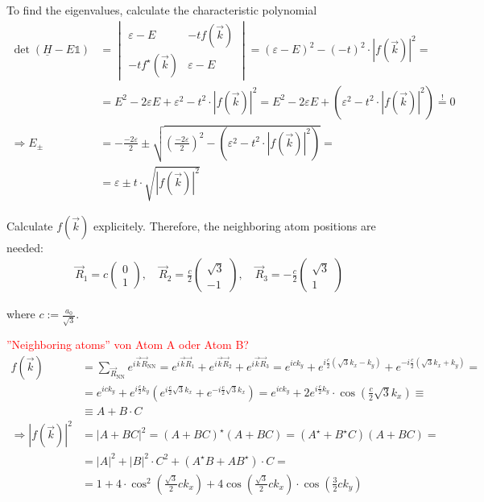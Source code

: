 \documentclass{article}
\newcommand{\lr}[1]{\left(#1\right)}
\begin{document}
{	To find the eigenvalues, calculate the characteristic polynomial
		\begin{align*}
			\det(\underline{H} - E\mathbb{1}) &=
			\begin{vmatrix}
				\varepsilon - E & -t f(\vec{k}) \\
				-t f^\star(\vec{k}) & \varepsilon - E
			\end{vmatrix}
			=
			(\varepsilon - E)^2 - (-t)^2 \cdot |f(\vec{k})|^2 = \\
			&= E^2 - 2\varepsilon E + \varepsilon^2 - t^2 \cdot |f(\vec{k})|^2 = E^2 - 2\varepsilon E + (\varepsilon^2 - t^2 \cdot |f(\vec{k})|^2) \stackrel{!}{=} 0 \\
			\Rightarrow E_\pm &= -\frac{-2\varepsilon}{2} \pm \sqrt{ \lr{\frac{-2\varepsilon}{2}}^2 - (\varepsilon^2 - t^2 \cdot |f(\vec{k})|^2 ) } = \\
			&= \varepsilon \pm t \cdot \sqrt{ |f(\vec{k})|^2 }
		\end{align*}
	
	Calculate $f(\vec{k})$ explicitely. Therefore, the neighboring atom positions are needed:
		\begin{align*}
			\vec{R}_1 = c
			\begin{pmatrix}
				0\\1
			\end{pmatrix}, \quad
			\vec{R}_2 = \frac{c}{2}
			\begin{pmatrix}
				\sqrt{3}\\-1
			\end{pmatrix}, \quad
			\vec{R}_3 = -\frac{c}{2}
			\begin{pmatrix}
				\sqrt{3}\\1
			\end{pmatrix} 
		\end{align*}

	where $c:=\frac{a_0}{\sqrt{3}}$.

\newpage


	\textcolor{red}{ ''Neighboring atoms'' von Atom A oder Atom B?}
		\begin{align*}
			f(\vec{k}) &= \sum_{\vec{R}_\text{NN}} e^{i\vec{k}\vec{R}_\text{NN}} = e^{i\vec{k}\vec{R}_1} + e^{i\vec{k}\vec{R}_2} + e^{i\vec{k}\vec{R}_3} = e^{ick_y} + e^{i\frac{c}{2}(\sqrt{3}k_x - k_y)} + e^{-i\frac{c}{2}(\sqrt{3}k_x + k_y)} = \\
			&= e^{ick_y} + e^{i\frac{c}{2}k_y} \lr{ e^{i\frac{c}{2}\sqrt{3}k_x} + e^{-i\frac{c}{2}\sqrt{3}k_x} } = e^{ick_y} + 2e^{i\frac{c}{2}k_y} \cdot \cos\lr{ \frac{c}{2}\sqrt{3}k_x } \equiv \\
			&\equiv A + B \cdot C \\
			\Rightarrow |f(\vec{k})|^2 &= |A + BC|^2 = (A+BC)^\star (A+BC) = (A^\star + B^\star C)(A + BC) = \\
			&= |A|^2 + |B|^2 \cdot C^2 + (A^\star B + AB^\star) \cdot C = \\
			&= 1 + 4 \cdot \cos^2\lr{ \frac{\sqrt{3}}{2}ck_x } + 4\cos\lr{ \frac{\sqrt{3}}{2}ck_x } \cdot \cos\lr{ \frac{3}{2}ck_y }
		\end{align*}
	
}
\end{document}
